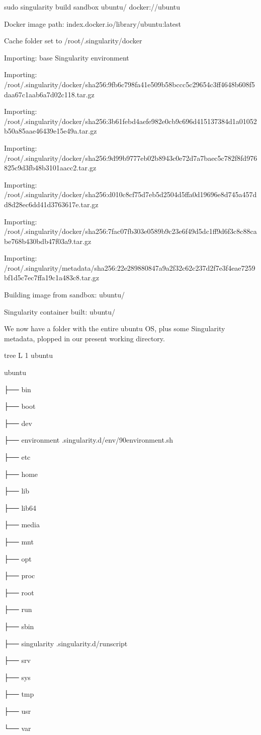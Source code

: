 \documentclass[letterpaper,10pt,english]{sphinxmanual}
\begin{document}
%
\begin{sphinxVerbatim}[commandchars=\\\{\}]
\PYGZdl{} sudo singularity build \PYGZhy{}\PYGZhy{}sandbox ubuntu/ docker://ubuntu

Docker image path: index.docker.io/library/ubuntu:latest

Cache folder set to /root/.singularity/docker

Importing: base Singularity environment

Importing: /root/.singularity/docker/sha256:9fb6c798fa41e509b58bccc5c29654c3ff4648b608f5daa67c1aab6a7d02c118.tar.gz

Importing: /root/.singularity/docker/sha256:3b61febd4aefe982e0cb9c696d415137384d1a01052b50a85aae46439e15e49a.tar.gz

Importing: /root/.singularity/docker/sha256:9d99b9777eb02b8943c0e72d7a7baec5c782f8fd976825c9d3fb48b3101aacc2.tar.gz

Importing: /root/.singularity/docker/sha256:d010c8cf75d7eb5d2504d5ffa0d19696e8d745a457dd8d28ec6dd41d3763617e.tar.gz

Importing: /root/.singularity/docker/sha256:7fac07fb303e0589b9c23e6f49d5dc1ff9d6f3c8c88cabe768b430bdb47f03a9.tar.gz

Importing: /root/.singularity/metadata/sha256:22e289880847a9a2f32c62c237d2f7e3f4eae7259bf1d5c7ec7ffa19c1a483c8.tar.gz

Building image from sandbox: ubuntu/

Singularity container built: ubuntu/
\end{sphinxVerbatim}

We now have a folder with the entire ubuntu OS, plus some Singularity
metadata, plopped in our present working directory.

%
\begin{sphinxVerbatim}[commandchars=\\\{\}]
 \PYGZdl{} tree \PYGZhy{}L 1 ubuntu

ubuntu

├── bin

├── boot

├── dev

├── environment \PYGZhy{}\PYGZgt{} .singularity.d/env/90\PYGZhy{}environment.sh

├── etc

├── home

├── lib

├── lib64

├── media

├── mnt

├── opt

├── proc

├── root

├── run

├── sbin

├── singularity \PYGZhy{}\PYGZgt{} .singularity.d/runscript

├── srv

├── sys

├── tmp

├── usr

└── var
\end{sphinxVerbatim}
\end{document}
